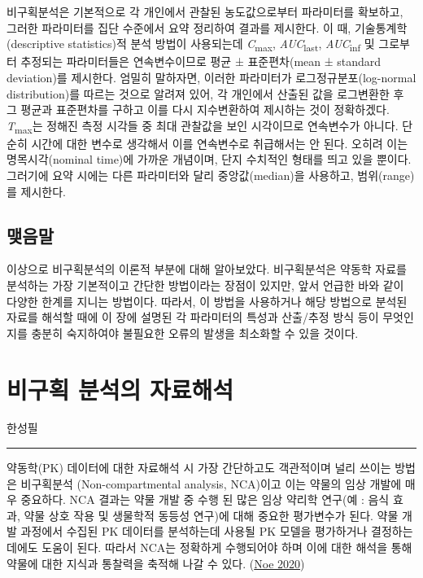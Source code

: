 \documentclass[
  11pt,
  krantz2, a4paper, twoside]{krantz}
\begin{document}
비구획분석은 기본적으로 각 개인에서 관찰된 농도값으로부터 파라미터를 확보하고, 그러한 파라미터를 집단 수준에서 요약 정리하여 결과를 제시한다. 이 때, 기술통계학(descriptive statistics)적 분석 방법이 사용되는데 \emph{C}\textsubscript{max}, \emph{AUC}\textsubscript{last}, \emph{AUC}\textsubscript{inf} 및 그로부터 추정되는 파라미터들은 연속변수이므로 평균 ± 표준편차(mean ± standard deviation)를 제시한다. 엄밀히 말하자면, 이러한 파라미터가 로그정규분포(log-normal distribution)를 따르는 것으로 알려져 있어, 각 개인에서 산출된 값을 로그변환한 후 그 평균과 표준편차를 구하고 이를 다시 지수변환하여 제시하는 것이 정확하겠다. \emph{T}\textsubscript{max}는 정해진 측정 시각들 중 최대 관찰값을 보인 시각이므로 연속변수가 아니다. 단순히 시간에 대한 변수로 생각해서 이를 연속변수로 취급해서는 안 된다. 오히려 이는 명목시각(nominal time)에 가까운 개념이며, 단지 수치적인 형태를 띄고 있을 뿐이다. 그러기에 요약 시에는 다른 파라미터와 달리 중앙값(median)을 사용하고, 범위(range)를 제시한다.

\hypertarget{uxb9fauxc74cuxb9d0-1}{%
\section{맺음말}\label{uxb9fauxc74cuxb9d0-1}}

이상으로 비구획분석의 이론적 부분에 대해 알아보았다. 비구획분석은 약동학 자료를 분석하는 가장 기본적이고 간단한 방법이라는 장점이 있지만, 앞서 언급한 바와 같이 다양한 한계를 지니는 방법이다. 따라서, 이 방법을 사용하거나 해당 방법으로 분석된 자료를 해석할 때에 이 장에 설명된 각 파라미터의 특성과 산출/추정 방식 등이 무엇인지를 충분히 숙지하여야 불필요한 오류의 발생을 최소화할 수 있을 것이다.

\hypertarget{nca-analysis}{%
\chapter{비구획 분석의 자료해석}\label{nca-analysis}}

\Large\hfill

한성필
\normalsize

\begin{center}\rule{0.5\linewidth}{0.5pt}\end{center}

약동학(PK) 데이터에 대한 자료해석 시 가장 간단하고도 객관적이며 널리 쓰이는 방법은 비구획분석 (Non-compartmental analysis, NCA)이고 이는 약물의 임상 개발에 매우 중요하다.
NCA 결과는 약물 개발 중 수행 된 많은 임상 약리학 연구(예 : 음식 효과, 약물 상호 작용 및 생물학적 동등성 연구)에 대해 중요한 평가변수가 된다.
약물 개발 과정에서 수집된 PK 데이터를 분석하는데 사용될 PK 모델을 평가하거나 결정하는데에도 도움이 된다.
따라서 NCA는 정확하게 수행되어야 하며 이에 대한 해석을 통해 약물에 대한 지식과 통찰력을 축적해 나갈 수 있다.
(\protect\hyperlink{ref-noe2020parameter}{Noe 2020})
\end{document}
